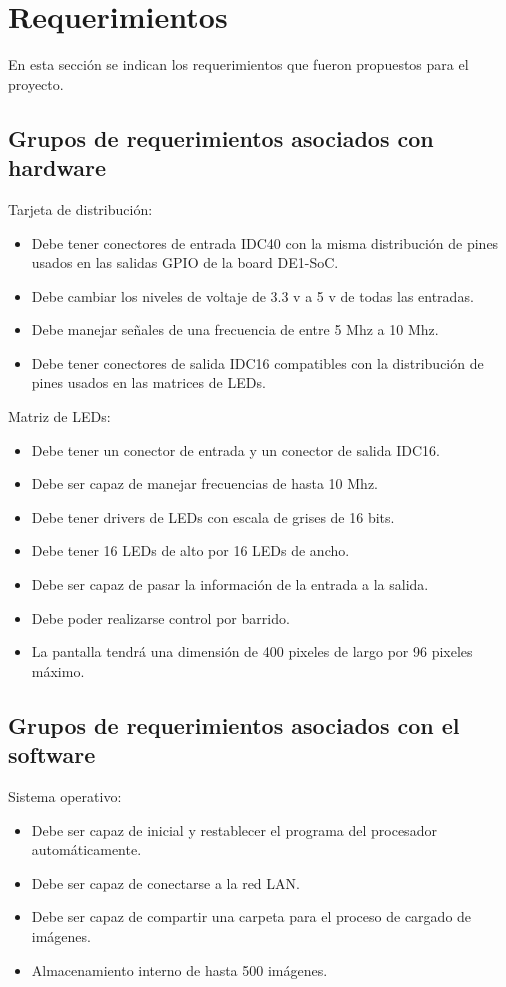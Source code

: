 \section{Requerimientos}
En esta sección se indican los requerimientos que fueron propuestos para el proyecto.

\subsection{Grupos de requerimientos asociados con hardware}

Tarjeta de distribución:
\begin{itemize}
\item Debe tener conectores de entrada IDC40 con la misma distribución de pines usados en las salidas GPIO de la board DE1-SoC.
\item Debe cambiar los niveles de voltaje de 3.3 v a 5 v de todas las entradas. 
\item Debe manejar señales de una frecuencia de entre 5 Mhz a 10 Mhz.
\item Debe tener conectores de salida IDC16 compatibles con la distribución de pines usados en las matrices de LEDs.
\end{itemize}
Matriz de LEDs:
\begin{itemize}
\item Debe tener un conector de entrada y un conector de salida IDC16.
\item Debe ser capaz de manejar frecuencias de hasta 10 Mhz.
\item Debe tener drivers de LEDs con escala de grises de 16 bits.
\item Debe tener 16 LEDs de alto por 16 LEDs de ancho.
\item Debe ser capaz de pasar la información de la entrada a la salida.
\item Debe poder realizarse control por barrido. 
\item La pantalla tendrá una dimensión de 400 pixeles de largo por 96 pixeles máximo.
\end{itemize}

\subsection{Grupos de requerimientos asociados con el software}

Sistema operativo:
\begin{itemize}
\item Debe ser capaz de inicial y restablecer el programa del procesador automáticamente.
\item Debe ser capaz de conectarse a la red LAN. 
\item Debe ser capaz de compartir una carpeta para el proceso de cargado de imágenes.
\item Almacenamiento interno de hasta 500 imágenes.
\end{itemize}

